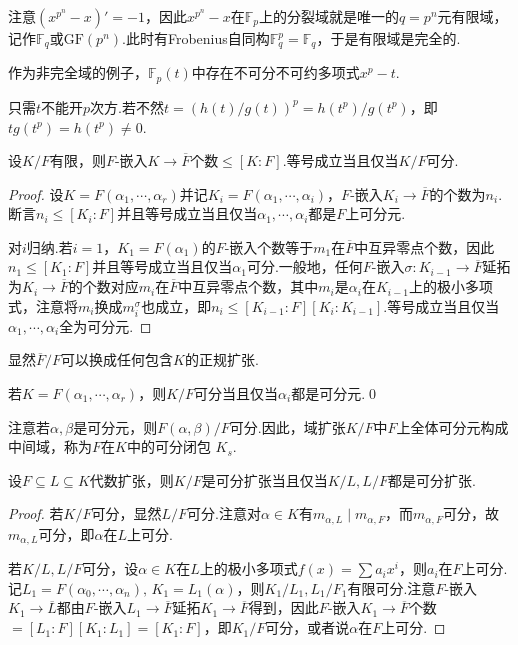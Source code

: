     注意$(x^{p^n}-x)'=-1$，因此$x^{p^n}-x$在$\mathbb{F}_p$上的分裂域就是唯一的$q=p^n$元{\heiti 有限域}，记作$\mathbb{F}_q$或$\mathrm{GF}(p^n)$.此时有Frobenius自同构$\mathbb{F}_q^p=\mathbb{F}_q$，于是有限域是完全的.
\begin{remark}
    作为非完全域的例子，$\mathbb{F}_p(t)$中存在不可分不可约多项式$x^p-t$.

    只需$t$不能开$p$次方.若不然$t=(h(t)/g(t))^p=h(t^p)/g(t^p)$，即$tg(t^p)=h(t^p)\ne 0$.
\end{remark}

\begin{prop}
    设$K/F$有限，则$F$-嵌入$K\to\overline{F}$个数$\le[K:F]$.等号成立当且仅当$K/F$可分.
\end{prop}
\begin{proof}
    设$K=F(\alpha_1,\cdots,\alpha_r)$并记$K_i=F(\alpha_1,\cdots,\alpha_i)$，$F$-嵌入$K_i\to\overline{F}$的个数为$n_i$.断言$n_i\le[K_i:F]$并且等号成立当且仅当$\alpha_1,\cdots,\alpha_i$都是$F$上可分元.

    对$i$归纳.若$i=1$，$K_1=F(\alpha_1)$的$F$-嵌入个数等于$m_1$在$\overline{F}$中互异零点个数，因此$n_1\le[K_1:F]$并且等号成立当且仅当$\alpha_1$可分.一般地，任何$F$-嵌入$\sigma\colon K_{i-1}\to\overline{F}$延拓为$K_i\to\overline{F}$的个数对应$m_i$在$\overline{F}$中互异零点个数，其中$m_i$是$\alpha_i$在$K_{i-1}$上的极小多项式，注意将$m_i$换成$m_i^\sigma$也成立，即$n_i\le[K_{i-1}:F][K_i:K_{i-1}]$.等号成立当且仅当$\alpha_1,\cdots,\alpha_i$全为可分元.
\end{proof}
\begin{remark}
    显然$\overline{F}/F$可以换成任何包含$K$的正规扩张.
\end{remark}
\begin{cor*}
    若$K=F(\alpha_1,\cdots,\alpha_r)$，则$K/F$可分当且仅当$\alpha_i$都是可分元.\qed
\end{cor*}
\begin{remark}
    注意若$\alpha,\beta$是可分元，则$F(\alpha,\beta)/F$可分.因此，域扩张$K/F$中$F$上全体可分元构成中间域，称为$F$在$K$中的{\heiti 可分闭包} $K_s$.
\end{remark}
\begin{prop}
    设$F\subseteq L\subseteq K$代数扩张，则$K/F$是可分扩张当且仅当$K/L,L/F$都是可分扩张.
\end{prop}
\begin{proof}
    若$K/F$可分，显然$L/F$可分.注意对$\alpha\in K$有$m_{\alpha,L}\mid m_{\alpha,F}$，而$m_{\alpha,F}$可分，故$m_{\alpha,L}$可分，即$\alpha$在$L$上可分.

    若$K/L,L/F$可分，设$\alpha\in K$在$L$上的极小多项式$f(x)=\sum a_ix^i$，则$a_i$在$F$上可分.记$L_1=F(\alpha_0,\cdots,\alpha_n),\,K_1=L_1(\alpha)$，则$K_1/L_1,L_1/F_1$有限可分.注意$F$-嵌入$K_1\to\overline{L}$都由$F$-嵌入$L_1\to\overline{F}$延拓$K_1\to\overline{F}$得到，因此$F$-嵌入$K_1\to\overline{F}$个数$=[L_1:F][K_1:L_1]=[K_1:F]$，即$K_1/F$可分，或者说$\alpha$在$F$上可分.
\end{proof}

